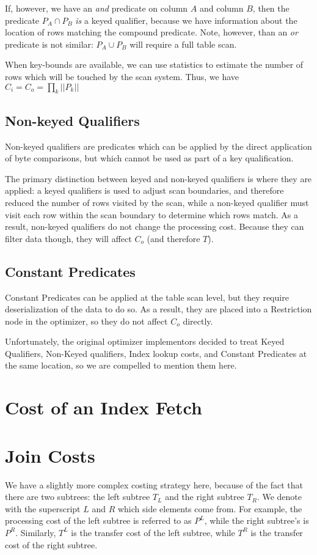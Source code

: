 \documentclass[10pt]{amsart}
\begin{document}
If, however, we have an \emph{and} predicate on column $A$ and column $B$, then the predicate $P_A \cap P_B$ \emph{is} a keyed qualifier, because we have information about the location of rows matching the compound predicate. Note, however, than an \emph{or} predicate is not similar: $P_A \cup P_B$ will require a full table scan.

When key-bounds are available, we can use statistics to estimate the number of rows which will be touched by the scan system. Thus, we have $C_i =C_o= \prod_k ||P_k||$

\subsection{Non-keyed Qualifiers}
Non-keyed qualifiers are predicates which can be applied by the direct application of byte comparisons, but which cannot be used as part of a key qualification. 

The primary distinction between keyed and non-keyed qualifiers is where they are applied: a keyed qualifiers is used to adjust scan boundaries, and therefore reduced the number of rows visited by the scan, while a non-keyed qualifier must visit each row within the scan boundary to determine which rows match. As a result, non-keyed qualifiers do not change the processing cost. Because they can filter data though, they will affect $C_o$ (and therefore $T$).

\subsection{Constant Predicates}
Constant Predicates can be applied at the table scan level, but they require deserialization of the data to do so. As a result, they are placed into a Restriction node in the optimizer, so they do not affect $C_o$ directly. 

Unfortunately, the original optimizer implementors decided to treat Keyed Qualifiers, Non-Keyed qualifiers, Index lookup costs, and Constant Predicates at the same location, so we are compelled to mention them here.

\section{Cost of an Index Fetch}

\section{Join Costs}
We have a slightly more complex costing strategy here, because of the fact that there are two subtrees: the left subtree $T_L$ and the right subtree $T_R$. We denote with the superscript $L$ and $R$ which side elements come from. For example, the processing cost of the left subtree is referred to as $P^L$, while the right subtree's is $P^R$. Similarly, $T^L$ is the transfer cost of the left subtree, while $T^R$ is the transfer cost of the right subtree.
\end{document}
